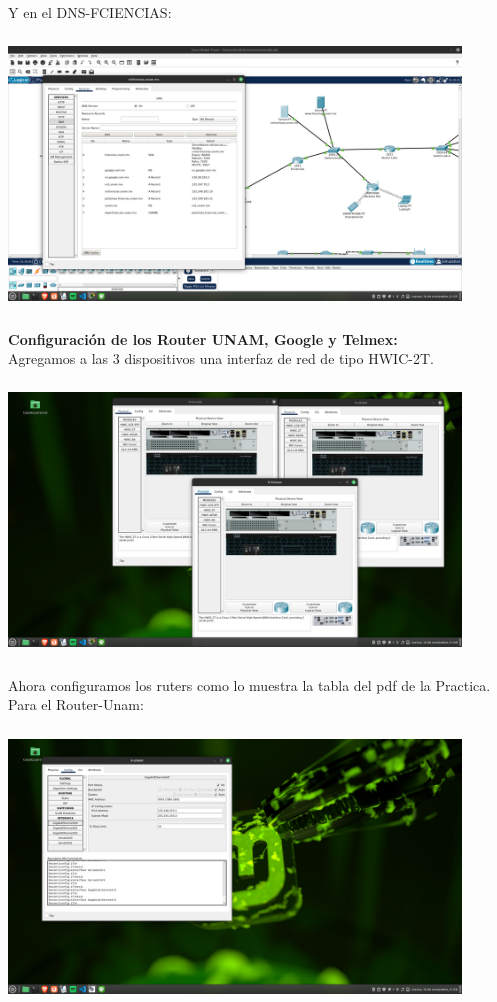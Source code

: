 \documentclass[14pt]{book}
\begin{document}
Y en el DNS-FCIENCIAS:\\

\includegraphics[width=12cm, height=8cm]{images/DNSCIENDIAS.png}\\

\textbf{Configuración de los Router UNAM, Google y Telmex:}\\

Agregamos a las 3 dispositivos una interfaz de red de tipo HWIC-2T.\\

\includegraphics[width=12cm, height=8cm]{images/fisico de ruters.png}\\

Ahora configuramos los ruters como lo muestra la tabla del pdf de la Practica.\\

Para el Router-Unam:\\

\includegraphics[width=12cm, height=8cm]{images/runam confi.png}\\
\end{document}
